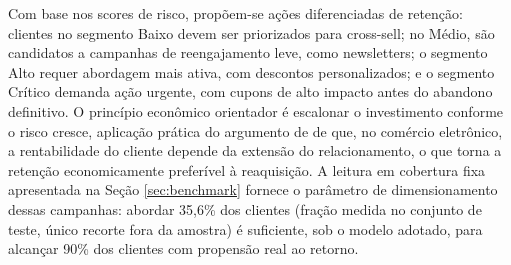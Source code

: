 Com base nos scores de risco, propõem-se ações diferenciadas de retenção: clientes no segmento Baixo devem ser priorizados para cross-sell; no Médio, são candidatos a campanhas de reengajamento leve, como newsletters; o segmento Alto requer abordagem mais ativa, com descontos personalizados; e o segmento Crítico demanda ação urgente, com cupons de alto impacto antes do abandono definitivo. O princípio econômico orientador é escalonar o investimento conforme o risco cresce, aplicação prática do argumento de  de que, no comércio eletrônico, a rentabilidade do cliente depende da extensão do relacionamento, o que torna a retenção economicamente preferível à reaquisição. A leitura em cobertura fixa apresentada na Seção \ref{sec:benchmark} fornece o parâmetro de dimensionamento dessas campanhas: abordar 35,6\% dos clientes (fração medida no conjunto de teste, único recorte fora da amostra) é suficiente, sob o modelo adotado, para alcançar 90\% dos clientes com propensão real ao retorno.

\FloatBarrier
